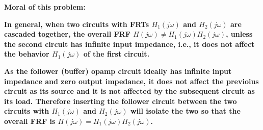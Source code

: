 \begin{enumerate}
  {\bf Moral of this problem:}

  {\bf In general, when two circuits with FRTs $H_1(j\omega)$ and $H_2(j\omega)$ are 
    cascaded together, the overall FRF $H(j\omega)\ne H_1(j\omega) H_2(j\omega)$,
    unless the second circuit has infinite input impedance, i.e., it does not affect
    the behavior $H_1(j\omega)$ of the first circuit.}

  {\bf As the follower (buffer) opamp circuit ideally has infinite input impedance and 
    zero output impedance, it does not affect the previoius circuit as its source and 
    it is not affected by the subsequent circuit as its load. Therefore inserting the 
    follower circuit between the two circuits with $H_1(j\omega)$ and $H_2(j\omega)$ 
    will isolate the two so that the overall FRF is $H(j\omega)=H_1(j\omega)H_2(j\omega)$.}

\end{enumerate}



